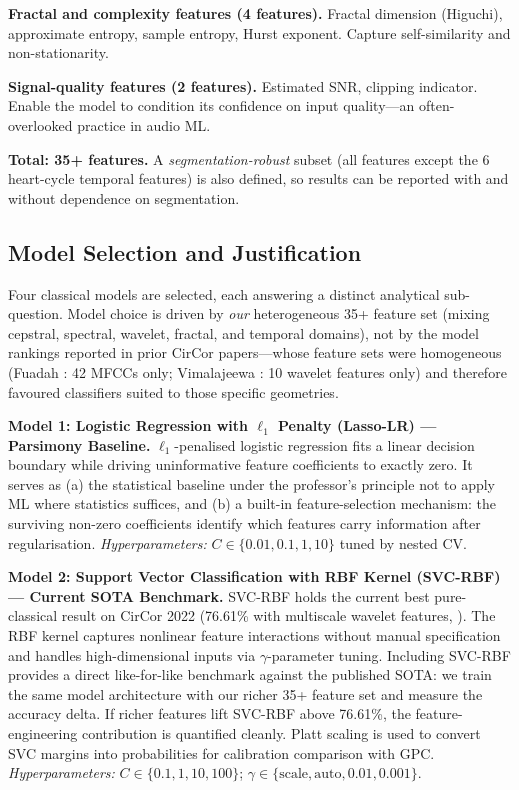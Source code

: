 \documentclass[10pt,twocolumn]{article}
\begin{document}
\textbf{Fractal and complexity features (4 features).} Fractal dimension (Higuchi), approximate entropy, sample entropy, Hurst exponent. Capture self-similarity and non-stationarity.

\textbf{Signal-quality features (2 features).} Estimated SNR, clipping indicator. Enable the model to condition its confidence on input quality---an often-overlooked practice in audio ML.

\textbf{Total: 35+ features.} A \textit{segmentation-robust} subset (all features except the 6 heart-cycle temporal features) is also defined, so results can be reported with and without dependence on segmentation.

\subsection{Model Selection and Justification}

Four classical models are selected, each answering a distinct analytical sub-question. Model choice is driven by \textit{our} heterogeneous 35+ feature set (mixing cepstral, spectral, wavelet, fractal, and temporal domains), not by the model rankings reported in prior CirCor papers---whose feature sets were homogeneous (Fuadah \citep{fuadah2023}: 42 MFCCs only; Vimalajeewa \citep{wavelet2025}: 10 wavelet features only) and therefore favoured classifiers suited to those specific geometries.

\textbf{Model 1: Logistic Regression with $\ell_1$ Penalty (Lasso-LR) --- Parsimony Baseline.} $\ell_1$-penalised logistic regression fits a linear decision boundary while driving uninformative feature coefficients to exactly zero. It serves as (a) the statistical baseline under the professor's principle not to apply ML where statistics suffices, and (b) a built-in feature-selection mechanism: the surviving non-zero coefficients identify which features carry information after regularisation.
\textit{Hyperparameters:} $C \in \{0.01, 0.1, 1, 10\}$ tuned by nested CV.

\textbf{Model 2: Support Vector Classification with RBF Kernel (SVC-RBF) --- Current SOTA Benchmark.} SVC-RBF holds the current best pure-classical result on CirCor 2022 (76.61\% with multiscale wavelet features, \citep{wavelet2025}). The RBF kernel captures nonlinear feature interactions without manual specification and handles high-dimensional inputs via $\gamma$-parameter tuning. Including SVC-RBF provides a direct like-for-like benchmark against the published SOTA: we train the same model architecture with our richer 35+ feature set and measure the accuracy delta. If richer features lift SVC-RBF above 76.61\%, the feature-engineering contribution is quantified cleanly. Platt scaling is used to convert SVC margins into probabilities for calibration comparison with GPC.
\textit{Hyperparameters:} $C \in \{0.1, 1, 10, 100\}$; $\gamma \in \{\text{scale}, \text{auto}, 0.01, 0.001\}$.
\end{document}
